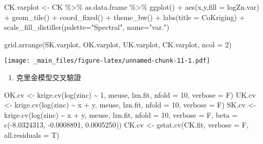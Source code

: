 \documentclass[
]{book}
\newenvironment{Shaded}{\begin{snugshade}}{\end{snugshade}}
\newcommand{\AttributeTok}[1]{\textcolor[rgb]{0.77,0.63,0.00}{#1}}
\newcommand{\DecValTok}[1]{\textcolor[rgb]{0.00,0.00,0.81}{#1}}
\newcommand{\FloatTok}[1]{\textcolor[rgb]{0.00,0.00,0.81}{#1}}
\newcommand{\FunctionTok}[1]{\textcolor[rgb]{0.00,0.00,0.00}{#1}}
\newcommand{\NormalTok}[1]{#1}
\newcommand{\OtherTok}[1]{\textcolor[rgb]{0.56,0.35,0.01}{#1}}
\newcommand{\SpecialCharTok}[1]{\textcolor[rgb]{0.00,0.00,0.00}{#1}}
\newcommand{\StringTok}[1]{\textcolor[rgb]{0.31,0.60,0.02}{#1}}
\providecommand{\tightlist}{%
  \setlength{\itemsep}{0pt}\setlength{\parskip}{0pt}}
\begin{document}
\begin{Shaded}
\begin{Highlighting}[]
\NormalTok{CK.varplot }\OtherTok{\textless{}{-}}\NormalTok{ CK }\SpecialCharTok{\%\textgreater{}\%}\NormalTok{ as.data.frame }\SpecialCharTok{\%\textgreater{}\%}
  \FunctionTok{ggplot}\NormalTok{() }\SpecialCharTok{+} \FunctionTok{aes}\NormalTok{(x,y,}\AttributeTok{fill =}\NormalTok{ logZn.var) }\SpecialCharTok{+} 
  \FunctionTok{geom\_tile}\NormalTok{() }\SpecialCharTok{+} \FunctionTok{coord\_fixed}\NormalTok{() }\SpecialCharTok{+} \FunctionTok{theme\_bw}\NormalTok{() }\SpecialCharTok{+} \FunctionTok{labs}\NormalTok{(}\AttributeTok{title =} \StringTok{\textquotesingle{}CoKriging\textquotesingle{}}\NormalTok{) }\SpecialCharTok{+} 
  \FunctionTok{scale\_fill\_distiller}\NormalTok{(}\AttributeTok{palette=}\StringTok{"Spectral"}\NormalTok{, }\AttributeTok{name=}\StringTok{"var."}\NormalTok{)}
  
\FunctionTok{grid.arrange}\NormalTok{(SK.varplot, OK.varplot, UK.varplot, CK.varplot, }\AttributeTok{ncol =} \DecValTok{2}\NormalTok{)}
\end{Highlighting}
\end{Shaded}

\texttt{[image: \_main\_files/figure-latex/unnamed-chunk-11-1.pdf]}

\begin{enumerate}
\def\labelenumi{\arabic{enumi}.}
\setcounter{enumi}{6}
\tightlist
\item
  克里金模型交叉驗證
\end{enumerate}

\begin{Shaded}
\begin{Highlighting}[]
\NormalTok{OK.cv }\OtherTok{\textless{}{-}} \FunctionTok{krige.cv}\NormalTok{(}\FunctionTok{log}\NormalTok{(zinc) }\SpecialCharTok{\textasciitilde{}} \DecValTok{1}\NormalTok{, meuse, lzn.fit,}
               \AttributeTok{nfold =} \DecValTok{10}\NormalTok{, }\AttributeTok{verbose =}\NormalTok{ F)}
\NormalTok{UK.cv }\OtherTok{\textless{}{-}} \FunctionTok{krige.cv}\NormalTok{(}\FunctionTok{log}\NormalTok{(zinc) }\SpecialCharTok{\textasciitilde{}}\NormalTok{ x }\SpecialCharTok{+}\NormalTok{ y, meuse, lzn.fit,}
                  \AttributeTok{nfold =} \DecValTok{10}\NormalTok{, }\AttributeTok{verbose =}\NormalTok{ F)}
\NormalTok{SK.cv }\OtherTok{\textless{}{-}} \FunctionTok{krige.cv}\NormalTok{(}\FunctionTok{log}\NormalTok{(zinc) }\SpecialCharTok{\textasciitilde{}}\NormalTok{ x }\SpecialCharTok{+}\NormalTok{ y, meuse, lzn.fit,}
                  \AttributeTok{nfold =} \DecValTok{10}\NormalTok{, }\AttributeTok{verbose =}\NormalTok{ F, }\AttributeTok{beta =} \FunctionTok{c}\NormalTok{(}\SpecialCharTok{{-}}\FloatTok{8.0324313}\NormalTok{, }\SpecialCharTok{{-}}\FloatTok{0.0008891}\NormalTok{, }\FloatTok{0.0005250}\NormalTok{))}
\NormalTok{CK.cv }\OtherTok{\textless{}{-}} \FunctionTok{gstat.cv}\NormalTok{(CK.fit, }\AttributeTok{verbose =}\NormalTok{ F, }\AttributeTok{all.residuals =}\NormalTok{ T)}
\end{Highlighting}
\end{Shaded}
\end{document}
